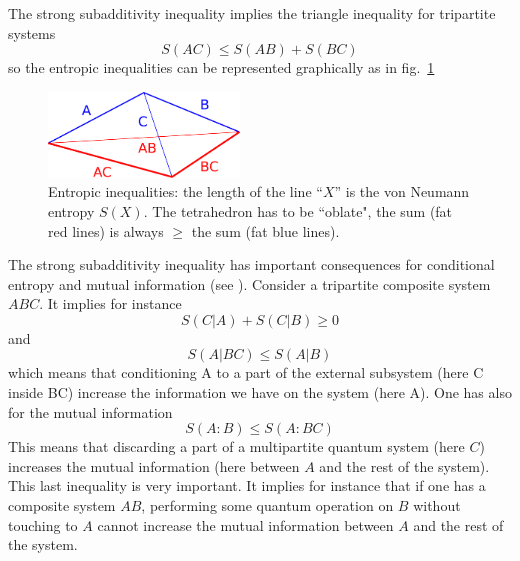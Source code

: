 The strong subadditivity inequality implies the triangle inequality for tripartite systems
\begin{equation}
\label{ }
S(AC)\le S(AB)+S(BC)
\end{equation}
so the entropic inequalities can be represented graphically as in fig.~\ref{fSSubT}
\begin{figure}[h]
\begin{center}
\includegraphics[width=2in]{Entropic-tetraedron.pdf}
\caption{Entropic inequalities: the length of the line ``$X$''  is the von Neumann entropy $S(X)$. The tetrahedron has to be ``oblate", the sum {\color{red}{AC+BC}} (fat red lines) is always $\ge$ the sum {\color{blue}{A+B}} (fat blue lines). }
\label{fSSubT}
\end{center}
\end{figure}

The strong subadditivity inequality has important consequences for conditional entropy and mutual information (see \cite{Nielsen:2010fk}). 
Consider a tripartite composite system $ABC$.
It implies for instance 
\begin{equation}
\label{ }
S(C|A)+S(C|B) \ge 0
\end{equation}
and
\begin{equation}
\label{ }
S(A|BC)\le S(A|B) 
\end{equation}
which means that conditioning A to a part of the external subsystem (here C inside BC) increase the information we have on the system (here A).
One has also for the mutual information
\begin{equation}
\label{ }
S(A:B)\le S(A:BC) 
\end{equation}
This means that discarding a part of a multipartite quantum system (here $C$) increases the mutual information (here between $A$ and the rest of the system).
This last inequality is very important. It implies for instance that if one has a composite system $AB$, performing some quantum operation on $B$ without touching to $A$ cannot increase the mutual information between $A$ and the rest of the system. 


